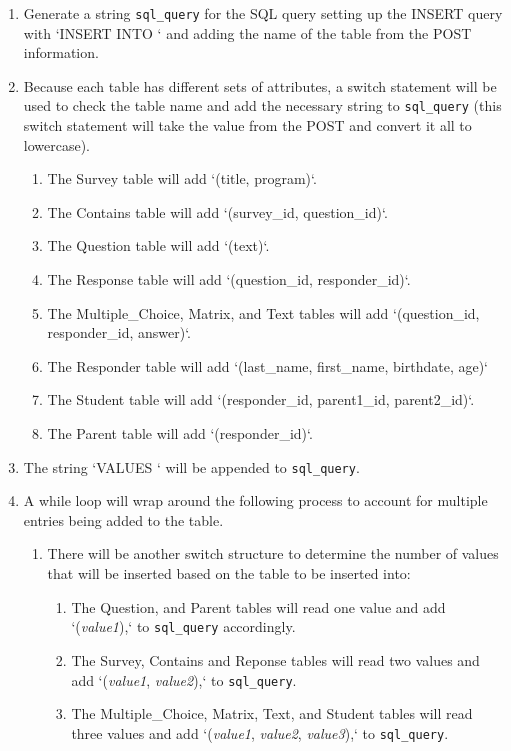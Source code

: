 \documentclass[letterpaper,10pt,serif, draftclsnofoot,onecolumn, compsoc, titlepage]{IEEEtran}
\begin{document}
\begin{enumerate}
	\item Generate a string \texttt{sql\_query} for the SQL query setting up the INSERT query with `INSERT INTO ` and adding the name of the table from the POST information.
	\item Because each table has different sets of attributes, a switch statement will be used to check the table name and add the necessary string to \texttt{sql\_query} (this switch statement will take the value from the POST and convert it all to lowercase).
	\begin{enumerate}
		\item The Survey table will add `(title, program)`.
		\item The Contains table will add `(survey\_id, question\_id)`.
		\item The Question table will add `(text)`.
		\item The Response table will add `(question\_id, responder\_id)`.
		\item The Multiple\_Choice, Matrix, and Text tables will add `(question\_id, responder\_id, answer)`.
		\item The Responder table will add `(last\_name, first\_name, birthdate, age)`
		\item The Student table will add `(responder\_id, parent1\_id, parent2\_id)`.
		\item The Parent table will add `(responder\_id)`.
	\end{enumerate}
	\item The string `VALUES ` will be appended to \texttt{sql\_query}.
	\item A while loop will wrap around the following process to account for multiple entries being added to the table.
	\begin{enumerate}
		\item There will be another switch structure to determine the number of values that will be inserted based on the table to be inserted into:
		\begin{enumerate}
			\item The Question, and Parent tables will read one value and add `(\emph{value1}),` to \texttt{sql\_query} accordingly.
			\item The Survey, Contains and Reponse tables will read two values and add `(\emph{value1}, \emph{value2}),` to \texttt{sql\_query}.
			\item The Multiple\_Choice, Matrix, Text, and Student tables will read three values and add `(\emph{value1}, \emph{value2}, \emph{value3}),` to \texttt{sql\_query}.

\end{enumerate}
\end{enumerate}
\end{enumerate}
\end{document}
